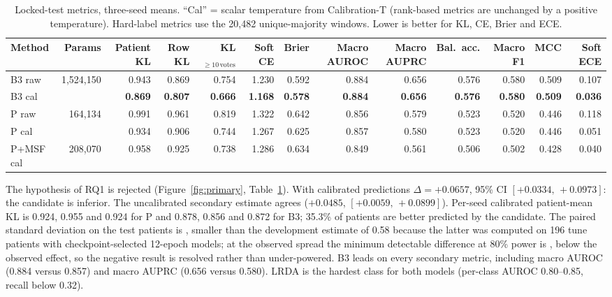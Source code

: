 \documentclass[sigconf,anonymous]{acmart}
\newcommand{\ci}[2]{[#1,\,#2]}
\begin{document}
\begin{table}[t]
\caption{Locked-test metrics, three-seed means. ``Cal'' = scalar temperature from Calibration-T (rank-based metrics are unchanged by a positive temperature). Hard-label metrics use the 20,482 unique-majority windows. Lower is better for KL, CE, Brier and ECE.}
\label{tab:test}
\footnotesize
\setlength{\tabcolsep}{3.5pt}
\begin{tabular}{lrrrrrrrrrrrr}
\toprule
Method & Params & Patient KL & Row KL & KL$_{\ge 10\,\text{votes}}$ & Soft CE & Brier & Macro AUROC & Macro AUPRC & Bal.\ acc. & Macro F1 & MCC & Soft ECE \\
\midrule
B3 raw & 1,524,150 & 0.943 & 0.869 & 0.754 & 1.230 & 0.592 & 0.884 & 0.656 & 0.576 & 0.580 & 0.509 & 0.107 \\
B3 cal & & \textbf{0.869} & \textbf{0.807} & \textbf{0.666} & \textbf{1.168} & \textbf{0.578} & \textbf{0.884} & \textbf{0.656} & \textbf{0.576} & \textbf{0.580} & \textbf{0.509} & \textbf{0.036} \\
P raw & 164,134 & 0.991 & 0.961 & 0.819 & 1.322 & 0.642 & 0.856 & 0.579 & 0.523 & 0.520 & 0.446 & 0.118 \\
P cal & & 0.934 & 0.906 & 0.744 & 1.267 & 0.625 & 0.857 & 0.580 & 0.523 & 0.520 & 0.446 & 0.051 \\
P+MSF cal & 208,070 & 0.958 & 0.925 & 0.738 & 1.286 & 0.634 & 0.849 & 0.561 & 0.506 & 0.502 & 0.428 & 0.040 \\
\bottomrule
\end{tabular}
\end{table}

The hypothesis of RQ1 is rejected (Figure~\ref{fig:primary}, Table~\ref{tab:test}). With calibrated predictions $\Delta=+0.0657$, 95\% CI $\ci{+0.0334}{+0.0973}$: the candidate is inferior. The uncalibrated secondary estimate agrees ($+0.0485$, $\ci{+0.0059}{+0.0899}$). Per-seed calibrated patient-mean KL is 0.924, 0.955 and 0.924 for P and 0.878, 0.856 and 0.872 for B3; 35.3\% of patients are better predicted by the candidate. The paired standard deviation on the \ntestpat{} test patients is \testpairedsd{}, smaller than the development estimate of 0.58 because the latter was computed on 196 tune patients with checkpoint-selected 12-epoch models; at the observed spread the minimum detectable difference at 80\% power is \testmde{}, below the observed effect, so the negative result is resolved rather than under-powered. B3 leads on every secondary metric, including macro AUROC (0.884 versus 0.857) and macro AUPRC (0.656 versus 0.580). LRDA is the hardest class for both models (per-class AUROC 0.80--0.85, recall below 0.32).
\end{document}
